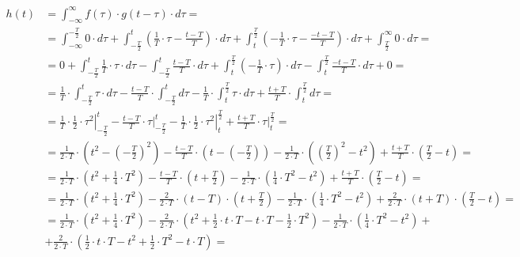\begin{task}
\begin{align*}
h(t)&=\int_{-\infty}^{\infty} f(\tau) \cdot g(t-\tau) \cdot d\tau=\\
&=\int_{-\infty}^{-\frac{T}{2}} 0 \cdot d\tau 
+ \int_{-\frac{T}{2}}^{t}\left( \frac{1}{T}\cdot \tau - \frac{t-T}{T} \right)\cdot d\tau 
+ \int_{t}^{\frac{T}{2}}\left( -\frac{1}{T}\cdot \tau - \frac{-t-T}{T} \right)\cdot d\tau 
+\int_{\frac{T}{2}}^{\infty} 0 \cdot d\tau=\\
&=0 
+ \int_{-\frac{T}{2}}^{t} \frac{1}{T}\cdot \tau \cdot d\tau -  \int_{-\frac{T}{2}}^{t} \frac{t-T}{T} \cdot d\tau 
+ \int_{t}^{\frac{T}{2}}\left( -\frac{1}{T}\cdot \tau\right) \cdot d\tau - \int_{t}^{\frac{T}{2}} \frac{-t-T}{T} \cdot d\tau 
+0=\\
&=\frac{1}{T}\cdot \int_{-\frac{T}{2}}^{t} \tau \cdot d\tau -  \frac{t-T}{T} \cdot \int_{-\frac{T}{2}}^{t} d\tau 
-\frac{1}{T}\cdot \int_{t}^{\frac{T}{2}} \tau \cdot d\tau +  \frac{t+T}{T} \cdot \int_{t}^{\frac{T}{2}} d\tau=\\
&=\frac{1}{T}\cdot \left. \frac{1}{2} \cdot \tau^2\right|_{-\frac{T}{2}}^{t} -  \frac{t-T}{T} \cdot \left. \tau 
\right|_{-\frac{T}{2}}^{t} - \frac{1}{T}\cdot \left. \frac{1}{2} \cdot \tau^2 \right|_{t}^{\frac{T}{2}} +  \frac{t+T}{T} \cdot \left. \tau \right|_{t}^{\frac{T}{2}}=\\
&=\frac{1}{2 \cdot T}\cdot \left( t^2 - \left(-\frac{T}{2}\right)^2\right) -  \frac{t-T}{T} \cdot \left( t - \left(-\frac{T}{2}\right) \right) - \frac{1}{2\cdot T}\cdot \left( \left(\frac{T}{2}\right)^2 - t^2\right) +  \frac{t+T}{T} \cdot \left( \frac{T}{2} - t \right)=\\
&=\frac{1}{2 \cdot T}\cdot \left( t^2 + \frac{1}{4} \cdot T^2\right) -  \frac{t-T}{T} \cdot \left( t + \frac{T}{2} \right) - \frac{1}{2\cdot T}\cdot \left( \frac{1}{4}\cdot T^2 - t^2\right) +  \frac{t+T}{T} \cdot \left( \frac{T}{2} - t \right)=\\
&=\frac{1}{2 \cdot T}\cdot \left( t^2 + \frac{1}{4} \cdot T^2\right) -  \frac{2}{2\cdot T} \cdot \left(t-T\right) \cdot \left( t + \frac{T}{2} \right) - \frac{1}{2\cdot T}\cdot \left( \frac{1}{4}\cdot T^2 - t^2\right) +  \frac{2}{2 \cdot T} \cdot \left(t+T\right) \cdot \left( \frac{T}{2} - t \right)=\\
&=\frac{1}{2 \cdot T}\cdot \left( t^2 + \frac{1}{4} \cdot T^2\right) -  \frac{2}{2\cdot T} \cdot \left(t^2 + \frac{1}{2} \cdot t \cdot T - t \cdot T - \frac{1}{2} \cdot T^2 \right) - \frac{1}{2\cdot T}\cdot \left( \frac{1}{4}\cdot T^2 - t^2\right) + \\
&+\frac{2}{2 \cdot T} \cdot \left(\frac{1}{2}\cdot t \cdot T - t^2 + \frac{1}{2} \cdot T^2 - t \cdot T \right)=\\

\end{align*}
\end{task}
